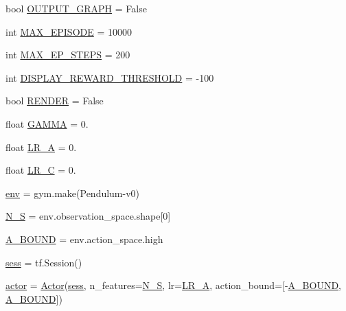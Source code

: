 \begin{DoxyCompactItemize}
\item 
bool \hyperlink{namespaceddpg__others_a8d8efc66aff50b88de22a9373e2d7602}{O\+U\+T\+P\+U\+T\+\_\+\+G\+R\+A\+PH} = False
\item 
int \hyperlink{namespaceddpg__others_afb464b6fe0768d57caf65334b4d8f87e}{M\+A\+X\+\_\+\+E\+P\+I\+S\+O\+DE} = 10000
\item 
int \hyperlink{namespaceddpg__others_a0db47bb3ba4a2b08dfae7438342b3ef1}{M\+A\+X\+\_\+\+E\+P\+\_\+\+S\+T\+E\+PS} = 200
\item 
int \hyperlink{namespaceddpg__others_abe31be53540bd026d448c7d8c7a10141}{D\+I\+S\+P\+L\+A\+Y\+\_\+\+R\+E\+W\+A\+R\+D\+\_\+\+T\+H\+R\+E\+S\+H\+O\+LD} = -\/100
\item 
bool \hyperlink{namespaceddpg__others_a2c384bab41511c29b415ab1bd8fe9726}{R\+E\+N\+D\+ER} = False
\item 
float \hyperlink{namespaceddpg__others_a38ab6c2b615e48356811e668c04931f5}{G\+A\+M\+MA} = 0.
\item 
float \hyperlink{namespaceddpg__others_a414c179cc14428441e47d44afc4dd8f2}{L\+R\+\_\+A} = 0.
\item 
float \hyperlink{namespaceddpg__others_af9a7b0578b28ea38c337e8db55f0bb7e}{L\+R\+\_\+C} = 0.
\item 
\hyperlink{namespaceddpg__others_afd02a34b64d07267055995ecab1de1d6}{env} = gym.\+make(\textquotesingle{}Pendulum-\/v0\textquotesingle{})
\item 
\hyperlink{namespaceddpg__others_a085e3af0235a4184f14e45c40242542c}{N\+\_\+S} = env.\+observation\+\_\+space.\+shape\mbox{[}0\mbox{]}
\item 
\hyperlink{namespaceddpg__others_a7e1c48752aba637fb6cea31fa0eaa826}{A\+\_\+\+B\+O\+U\+ND} = env.\+action\+\_\+space.\+high
\item 
\hyperlink{namespaceddpg__others_a88947f5e132c9538f8d4ce16004711ca}{sess} = tf.\+Session()
\item 
\hyperlink{namespaceddpg__others_ac9344417e957a7971f46d25644f70741}{actor} = \hyperlink{classddpg__others_1_1_actor}{Actor}(\hyperlink{namespaceddpg__others_a88947f5e132c9538f8d4ce16004711ca}{sess}, n\+\_\+features=\hyperlink{namespaceddpg__others_a085e3af0235a4184f14e45c40242542c}{N\+\_\+S}, lr=\hyperlink{namespaceddpg__others_a414c179cc14428441e47d44afc4dd8f2}{L\+R\+\_\+A}, action\+\_\+bound=\mbox{[}-\/\hyperlink{namespaceddpg__others_a7e1c48752aba637fb6cea31fa0eaa826}{A\+\_\+\+B\+O\+U\+ND}, \hyperlink{namespaceddpg__others_a7e1c48752aba637fb6cea31fa0eaa826}{A\+\_\+\+B\+O\+U\+ND}\mbox{]})

\end{DoxyCompactItemize}
